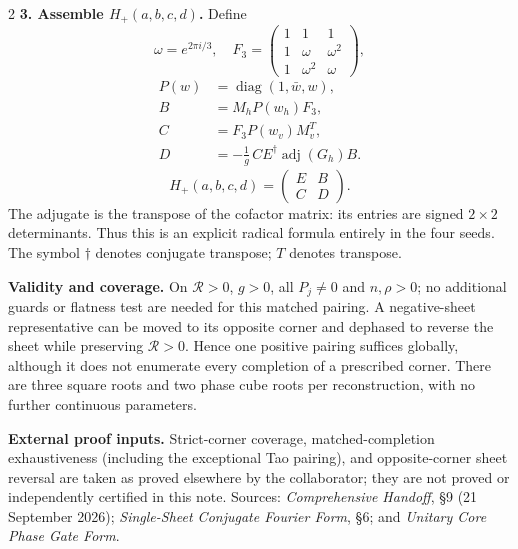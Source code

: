 \documentclass[10pt]{article}
\newcommand{\R}{\mathcal R}
\begin{document}
\begin{multicols}{2}
\textbf{3. Assemble $H_+(a,b,c,d)$.} Define
\[
\omega=e^{2\pi i/3},\quad
F_3=\begin{pmatrix}1&1&1\\1&\omega&\omega^2\\1&\omega^2&\omega\end{pmatrix},
\]
\[
\begin{aligned}
P(w)&=\operatorname{diag}(1,\bar w,w),\\
B&=M_hP(w_h)F_3,\\
C&=F_3P(w_v)M_v^T,\\
D&=-\frac1g\,CE^\dagger\operatorname{adj}(G_h)B.
\end{aligned}
\]
\[
\boxed{\displaystyle H_+(a,b,c,d)=\begin{pmatrix}E&B\\C&D\end{pmatrix}.}
\]
The adjugate is the transpose of the cofactor matrix: its entries are signed $2\times2$ determinants. Thus this is an explicit radical formula entirely in the four seeds. The symbol $\dagger$ denotes conjugate transpose; $T$ denotes transpose.
\end{multicols}
\vspace{-3pt}
\textbf{Validity and coverage.} On $\R>0$, $g>0$, all $P_j\ne0$ and $n,\rho>0$; no additional guards or flatness test are needed for this matched pairing. A negative-sheet representative can be moved to its opposite corner and dephased to reverse the sheet while preserving $\R>0$. Hence one positive pairing suffices globally, although it does not enumerate every completion of a prescribed corner. There are three square roots and two phase cube roots per reconstruction, with no further continuous parameters.

{\footnotesize\textbf{External proof inputs.} Strict-corner coverage, matched-completion exhaustiveness (including the exceptional Tao pairing), and opposite-corner sheet reversal are taken as proved elsewhere by the collaborator; they are not proved or independently certified in this note. Sources: \textit{Comprehensive Handoff}, \S9 (21 September 2026); \textit{Single-Sheet Conjugate Fourier Form}, \S6; and \textit{Unitary Core Phase Gate Form}.}
\end{document}
